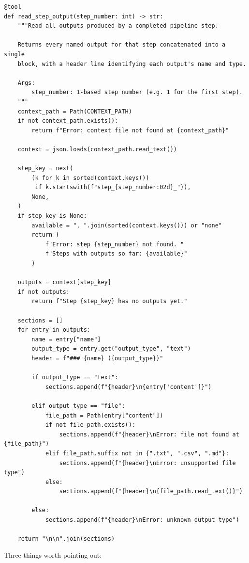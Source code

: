 \documentclass[12pt, a4paper]{article}
\begin{document}
\begin{lstlisting}[style=pythonstyle]
@tool
def read_step_output(step_number: int) -> str:
    """Read all outputs produced by a completed pipeline step.

    Returns every named output for that step concatenated into a single
    block, with a header line identifying each output's name and type.

    Args:
        step_number: 1-based step number (e.g. 1 for the first step).
    """
    context_path = Path(CONTEXT_PATH)
    if not context_path.exists():
        return f"Error: context file not found at {context_path}"

    context = json.loads(context_path.read_text())

    step_key = next(
        (k for k in sorted(context.keys())
         if k.startswith(f"step_{step_number:02d}_")),
        None,
    )
    if step_key is None:
        available = ", ".join(sorted(context.keys())) or "none"
        return (
            f"Error: step {step_number} not found. "
            f"Steps with outputs so far: {available}"
        )

    outputs = context[step_key]
    if not outputs:
        return f"Step {step_key} has no outputs yet."

    sections = []
    for entry in outputs:
        name = entry["name"]
        output_type = entry.get("output_type", "text")
        header = f"### {name} ({output_type})"

        if output_type == "text":
            sections.append(f"{header}\n{entry['content']}")

        elif output_type == "file":
            file_path = Path(entry["content"])
            if not file_path.exists():
                sections.append(f"{header}\nError: file not found at {file_path}")
            elif file_path.suffix not in {".txt", ".csv", ".md"}:
                sections.append(f"{header}\nError: unsupported file type")
            else:
                sections.append(f"{header}\n{file_path.read_text()}")

        else:
            sections.append(f"{header}\nError: unknown output_type")

    return "\n\n".join(sections)
\end{lstlisting}

Three things worth pointing out:
\end{document}
